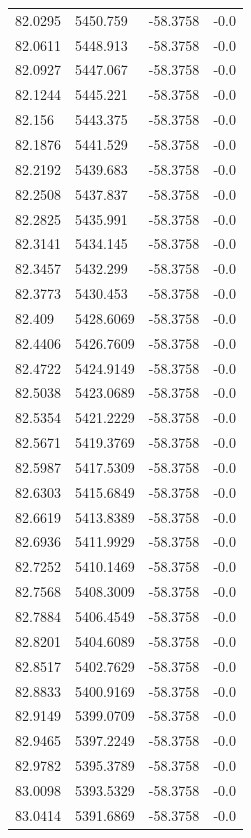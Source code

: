 \begin{table}[H]
\begin{tabular}{llll}
82.0295 & 5450.759 & -58.3758 & -0.0 \\
82.0611 & 5448.913 & -58.3758 & -0.0 \\
82.0927 & 5447.067 & -58.3758 & -0.0 \\
82.1244 & 5445.221 & -58.3758 & -0.0 \\
82.156 & 5443.375 & -58.3758 & -0.0 \\
82.1876 & 5441.529 & -58.3758 & -0.0 \\
82.2192 & 5439.683 & -58.3758 & -0.0 \\
82.2508 & 5437.837 & -58.3758 & -0.0 \\
82.2825 & 5435.991 & -58.3758 & -0.0 \\
82.3141 & 5434.145 & -58.3758 & -0.0 \\
82.3457 & 5432.299 & -58.3758 & -0.0 \\
82.3773 & 5430.453 & -58.3758 & -0.0 \\
82.409 & 5428.6069 & -58.3758 & -0.0 \\
82.4406 & 5426.7609 & -58.3758 & -0.0 \\
82.4722 & 5424.9149 & -58.3758 & -0.0 \\
82.5038 & 5423.0689 & -58.3758 & -0.0 \\
82.5354 & 5421.2229 & -58.3758 & -0.0 \\
82.5671 & 5419.3769 & -58.3758 & -0.0 \\
82.5987 & 5417.5309 & -58.3758 & -0.0 \\
82.6303 & 5415.6849 & -58.3758 & -0.0 \\
82.6619 & 5413.8389 & -58.3758 & -0.0 \\
82.6936 & 5411.9929 & -58.3758 & -0.0 \\
82.7252 & 5410.1469 & -58.3758 & -0.0 \\
82.7568 & 5408.3009 & -58.3758 & -0.0 \\
82.7884 & 5406.4549 & -58.3758 & -0.0 \\
82.8201 & 5404.6089 & -58.3758 & -0.0 \\
82.8517 & 5402.7629 & -58.3758 & -0.0 \\
82.8833 & 5400.9169 & -58.3758 & -0.0 \\
82.9149 & 5399.0709 & -58.3758 & -0.0 \\
82.9465 & 5397.2249 & -58.3758 & -0.0 \\
82.9782 & 5395.3789 & -58.3758 & -0.0 \\
83.0098 & 5393.5329 & -58.3758 & -0.0 \\
83.0414 & 5391.6869 & -58.3758 & -0.0 \\

\end{tabular}
\end{table}
